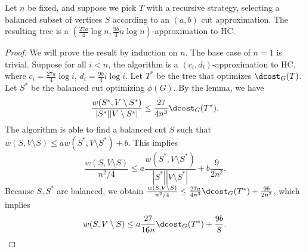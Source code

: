 \begin{thm}
Let $n$ be fixed, and suppose we pick $T$ with a recursive strategy, selecting a balanced subset of vertices $S$ according to an $(a, b)$ cut approximation. The resulting tree is a $(\frac{27a}{4}\log n, \frac{9b}{4}n \log n)$-approximation to HC.
\end{thm}
\begin{proof}
We will prove the result by induction on $n$. The base case of $n=1$ is trivial.
Suppose for all $i < n$, the algorithm is a $(c_i, d_i)$-approximation to HC, where $c_i = \frac{27a}{4} \log i$, 
$d_i = \frac{9b}{4} i \log i$.
Let $T^*$ be the tree that optimizes $\dcost_G(T)$. Let $S^*$ be the balanced cut optimizing $\phi(G)$. By the lemma, we have
\[
\frac{w(S^*, V \setminus S^*)}{|S^*||V \setminus S^*|} \leq \frac{27}{4 n^3}\dcost_G(T^*).
\]
The algorithm is able to find a balanced cut $S$ such that $w(S, V \setminus S) \leq aw(S^*, V \setminus S^*) + b$. This implies
\[
    \frac{w(S, V \setminus S)}{n^2/4} \leq a\frac{w(S^*, V \setminus S^*)}{|S^*||V \setminus S^*|} + b\frac{9}{2n^2}. 
\]
Because $S,S^*$ are balanced, we obtain $\frac{w(S, V \setminus S)}{n^2/4} \leq \frac{27 a}{4n^3}\dcost_G(T^*) + \frac{9b}{2n^2}$, which implies
\[
    w(S, V \setminus S) \leq a \frac{27}{16n}\dcost_G(T^*) + \frac{9b}{8}.
\]


\end{proof}
